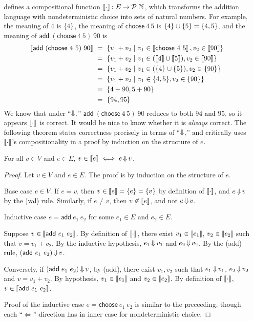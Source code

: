  defines a compositional function $\left\llbracket{\cdot}\right\rrbracket : E \to \mathcal{P}~\mathbb{N}$, which transforms the addition language with nondeterministic choice into sets of natural numbers.
For example, the meaning of $4$ is $\{{4}\}$, the meaning of $\mathsf{choose}~4~5$ is $\{{4}\} \cup \{{5}\} = \{{4,5}\}$, and the meaning of $\mathsf{add}~(\mathsf{choose}~4~5)~90$ is
\begin{equation}
\begin{aligned}
	\left\llbracket{\mathsf{add}~(\mathsf{choose}~4~5)~90}\right\rrbracket
	&\ =\ \lbrace {v_1 + v_2} \ \lvert\ {v_1 \in \left\llbracket{\mathsf{choose}~4~5}\right\rrbracket, v_2 \in \left\llbracket{90}\right\rrbracket} \rbrace
\\
	&\ =\ \lbrace {v_1 + v_2} \ \lvert\ {v_1 \in (\left\llbracket{4}\right\rrbracket \cup \left\llbracket{5}\right\rrbracket), v_2 \in \left\llbracket{90}\right\rrbracket} \rbrace 
\\
	&\ =\ \lbrace {v_1 + v_2} \ \lvert\ {v_1 \in (\{{4}\} \cup \{{5}\}), v_2 \in \{{90}\}} \rbrace
\\
	&\ =\ \lbrace {v_1 + v_2} \ \lvert\ {v_1 \in \{{4,5}\}, v_2 \in \{{90}\}} \rbrace
\\
	&\ =\ \{{4+90,5+90}\}
\\
	&\ =\ \{{94,95}\}
\end{aligned}
\end{equation}
We know that under ``$\operatorname{\Downarrow}$,'' $\mathsf{add}~(\mathsf{choose}~4~5)~90$ reduces to both $94$ and $95$, so it appears $\left\llbracket{\cdot}\right\rrbracket$ is correct.
It would be nice to know whether it is \emph{always} correct.
The following theorem states correctness precisely in terms of ``$\operatorname{\Downarrow}$,'' and critically uses $\left\llbracket{\cdot}\right\rrbracket$'s compositionality in a proof by induction on the structure of $e$.

\begin{theorem}[correctness]
For all $v \in V$ and $e \in E$, $v \in \left\llbracket{e}\right\rrbracket \iff e \operatorname{\Downarrow} v$.
\end{theorem}
\begin{proof}
Let $v \in V$ and $e \in E$.
The proof is by induction on the structure of $e$.

Base case $e \in V$.
If $e = v$, then $v \in \left\llbracket{e}\right\rrbracket = \{{e}\} = \{{v}\}$ by definition of $\left\llbracket{\cdot}\right\rrbracket$, and $e \operatorname{\Downarrow} v$ by the (val) rule.
Similarly, if $e \neq v$, then $v \not\in \left\llbracket{e}\right\rrbracket$, and not $e \operatorname{\Downarrow} v$.

Inductive case $e = \mathsf{add}~e_1~e_2$ for some $e_1 \in E$ and $e_2 \in E$.

Suppose $v \in \left\llbracket{\mathsf{add}~e_1~e_2}\right\rrbracket$.
By definition of $\left\llbracket{\cdot}\right\rrbracket$, there exist $v_1 \in \left\llbracket{e_1}\right\rrbracket$, $v_2 \in \left\llbracket{e_2}\right\rrbracket$ such that $v = v_1 + v_2$.
By the inductive hypothesis, $e_1 \operatorname{\Downarrow} v_1$ and $e_2 \operatorname{\Downarrow} v_2$.
By the (add) rule, $(\mathsf{add}~e_1~e_2) \operatorname{\Downarrow} v$.

Conversely, if $(\mathsf{add}~e_1~e_2) \operatorname{\Downarrow} v$,
by (add), there exist $v_1,v_2$ such that $e_1 \operatorname{\Downarrow} v_1$, $e_2 \operatorname{\Downarrow} v_2$ and $v = v_1 + v_2$.
By hypothesis, $v_1 \in \left\llbracket{e_1}\right\rrbracket$ and $v_2 \in \left\llbracket{e_2}\right\rrbracket$.
By definition of $\left\llbracket{\cdot}\right\rrbracket$, $v \in \left\llbracket{\mathsf{add}~e_1~e_2}\right\rrbracket$.

Proof of the inductive case $e = \mathsf{choose}~e_1~e_2$ is similar to the preceeding, though each ``${\Longleftrightarrow}$'' direction has in inner case for nondeterministic choice.
\end{proof}

